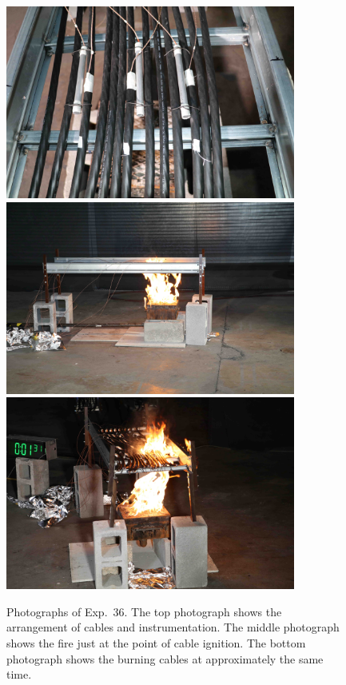 \begin{figure}[p]
\centering
\includegraphics[height=2.50in]{../FIGURES/Test_36_setup} \\ \vspace{0.1in}
\includegraphics[height=2.50in]{../FIGURES/Test_36_side} \\ \vspace{0.1in}
\includegraphics[height=2.50in]{../FIGURES/Test_36_1_min_31_s}
\caption[Photographs of Exp.~36]{Photographs of Exp.~36. The top photograph shows the arrangement of cables and instrumentation. The middle photograph shows the fire just at the point of cable ignition. The bottom photograph shows the burning cables at approximately the same time.}
\label{fig:Test_36_photos}
\end{figure}


